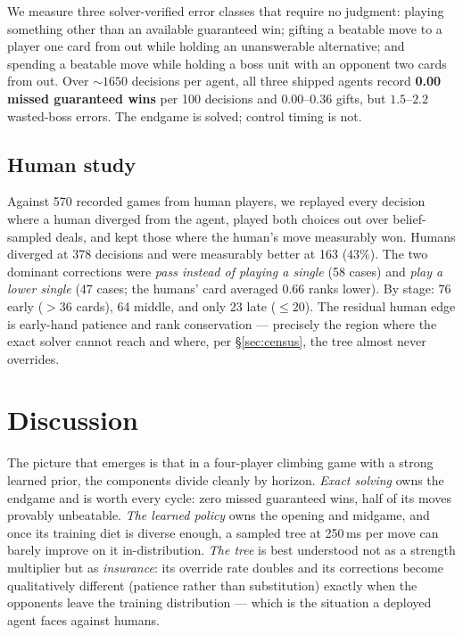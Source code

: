 \documentclass[11pt]{article}
\begin{document}
We measure three solver-verified error classes that require no
judgment: playing something other than an available guaranteed win;
gifting a beatable move to a player one card from out while holding an
unanswerable alternative; and spending a beatable move while holding a
boss unit with an opponent two cards from out. Over $\sim 1650$
decisions per agent, all three shipped agents record \textbf{0.00
missed guaranteed wins} per 100 decisions and $0.00$--$0.36$ gifts, but
$1.5$--$2.2$ wasted-boss errors. The endgame is solved; control timing
is not.

\subsection{Human study}

Against 570 recorded games from human players, we replayed every
decision where a human diverged from the agent, played both choices out
over belief-sampled deals, and kept those where the human's move
measurably won. Humans diverged at 378 decisions and were measurably
better at 163 ($43\%$). The two dominant corrections were \emph{pass
instead of playing a single} (58 cases) and \emph{play a lower single}
(47 cases; the humans' card averaged $0.66$ ranks lower). By stage:
76 early ($>36$ cards), 64 middle, and only 23 late ($\leq 20$). The
residual human edge is early-hand patience and rank conservation ---
precisely the region where the exact solver cannot reach and where, per
\S\ref{sec:census}, the tree almost never overrides.

\section{Discussion}

The picture that emerges is that in a four-player climbing game with a
strong learned prior, the components divide cleanly by horizon.
\emph{Exact solving} owns the endgame and is worth every cycle:
zero missed guaranteed wins, half of its moves provably unbeatable.
\emph{The learned policy} owns the opening and midgame, and once its
training diet is diverse enough, a sampled tree at 250\,ms
per move can barely improve on it in-distribution. \emph{The tree} is
best understood not as a strength multiplier but as
\emph{insurance}: its override rate doubles and its corrections become
qualitatively different (patience rather than substitution) exactly
when the opponents leave the training distribution --- which is the
situation a deployed agent faces against humans.
\end{document}
